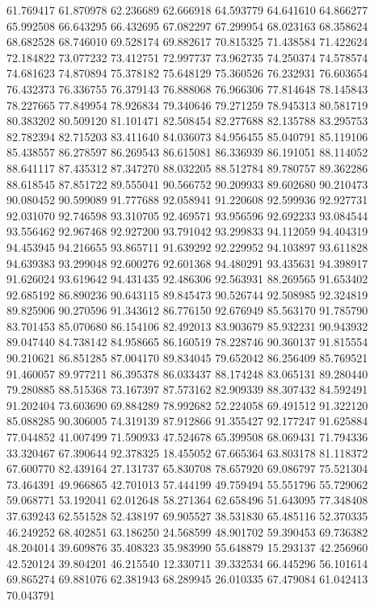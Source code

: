 61.769417
61.870978
62.236689
62.666918
64.593779
64.641610
64.866277
65.992508
66.643295
66.432695
67.082297
67.299954
68.023163
68.358624
68.682528
68.746010
69.528174
69.882617
70.815325
71.438584
71.422624
72.184822
73.077232
73.412751
72.997737
73.962735
74.250374
74.578574
74.681623
74.870894
75.378182
75.648129
75.360526
76.232931
76.603654
76.432373
76.336755
76.379143
76.888068
76.966306
77.814648
78.145843
78.227665
77.849954
78.926834
79.340646
79.271259
78.945313
80.581719
80.383202
80.509120
81.101471
82.508454
82.277688
82.135788
83.295753
82.782394
82.715203
83.411640
84.036073
84.956455
85.040791
85.119106
85.438557
86.278597
86.269543
86.615081
86.336939
86.191051
88.114052
88.641117
87.435312
87.347270
88.032205
88.512784
89.780757
89.362286
88.618545
87.851722
89.555041
90.566752
90.209933
89.602680
90.210473
90.080452
90.599089
91.777688
92.058941
91.220608
92.599936
92.927731
92.031070
92.746598
93.310705
92.469571
93.956596
92.692233
93.084544
93.556462
92.967468
92.927200
93.791042
93.299833
94.112059
94.404319
94.453945
94.216655
93.865711
91.639292
92.229952
94.103897
93.611828
94.639383
93.299048
92.600276
92.601368
94.480291
93.435631
94.398917
91.626024
93.619642
94.431435
92.486306
92.563931
88.269565
91.653402
92.685192
86.890236
90.643115
89.845473
90.526744
92.508985
92.324819
89.825906
90.270596
91.343612
86.776150
92.676949
85.563170
91.785790
83.701453
85.070680
86.154106
82.492013
83.903679
85.932231
90.943932
89.047440
84.738142
84.958665
86.160519
78.228746
90.360137
91.815554
90.210621
86.851285
87.004170
89.834045
79.652042
86.256409
85.769521
91.460057
89.977211
86.395378
86.033437
88.174248
83.065131
89.280440
79.280885
88.515368
73.167397
87.573162
82.909339
88.307432
84.592491
91.202404
73.603690
69.884289
78.992682
52.224058
69.491512
91.322120
85.088285
90.306005
74.319139
87.912866
91.355427
92.177247
91.625884
77.044852
41.007499
71.590933
47.524678
65.399508
68.069431
71.794336
33.320467
67.390644
92.378325
18.455052
67.665364
63.803178
81.118372
67.600770
82.439164
27.131737
65.830708
78.657920
69.086797
75.521304
73.464391
49.966865
42.701013
57.444199
49.759494
55.551796
55.729062
59.068771
53.192041
62.012648
58.271364
62.658496
51.643095
77.348408
37.639243
62.551528
52.438197
69.905527
38.531830
65.485116
52.370335
46.249252
68.402851
63.186250
24.568599
48.901702
59.390453
69.736382
48.204014
39.609876
35.408323
35.983990
55.648879
15.293137
42.256960
42.520124
39.804201
46.215540
12.330711
39.332534
66.445296
56.101614
69.865274
69.881076
62.381943
68.289945
26.010335
67.479084
61.042413
70.043791
